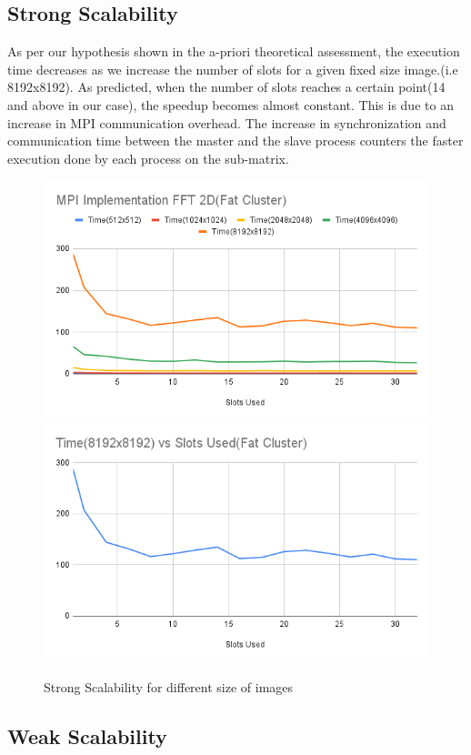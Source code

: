 \documentclass{article}
\begin{document}
\subsection{Strong Scalability} As per our hypothesis shown in the a-priori theoretical assessment, the execution time decreases as we increase the number of slots for a given fixed size image.(i.e 8192x8192). As predicted, when the number of slots reaches a certain point(14 and above in our case), the speedup becomes almost constant. This is due to an increase in MPI communication overhead. The increase in synchronization and communication time between the master and the slave process counters the faster execution done by each process on the sub-matrix.
\begin{figure}[hb]
    \includegraphics[width=.48\textwidth]{MPI Implementation FFT 2D(Fat Cluster).png}\hfill
    \includegraphics[width=.48\textwidth]{Time(8192x8192) vs Slots Used(Fat Cluster).png}
    \caption{Strong Scalability for different size of images}
    \label{fig:Strong Scalability}
\end{figure}
\newpage
\subsection{Weak Scalability}
\end{document}
